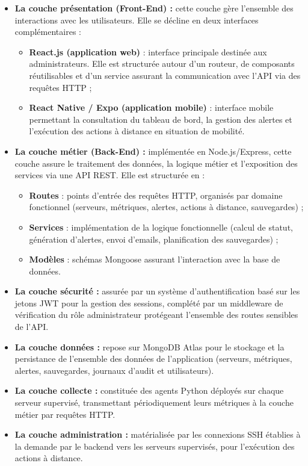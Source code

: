 \begin{itemize}[label=]
\item \textbf{La couche présentation (Front-End) :} cette couche gère l'ensemble des
interactions avec les utilisateurs. Elle se décline en deux interfaces complémentaires :
\begin{itemize}[label=]
    \item \textbf{React.js (application web)} : interface principale destinée aux
    administrateurs. Elle est structurée autour d'un routeur, de composants réutilisables
    et d'un service assurant la communication avec l'API via des requêtes HTTP ;
    \item \textbf{React Native / Expo (application mobile)} : interface mobile permettant
    la consultation du tableau de bord, la gestion des alertes et l'exécution des actions
    à distance en situation de mobilité.
\end{itemize}

\item \textbf{La couche métier (Back-End) :} implémentée en Node.js/Express, cette
couche assure le traitement des données, la logique métier et l'exposition des services
via une API REST. Elle est structurée en :
\begin{itemize}[label=]
    \item \textbf{Routes} : points d'entrée des requêtes HTTP, organisés par domaine
    fonctionnel (serveurs, métriques, alertes, actions à distance, sauvegardes) ;
    \item \textbf{Services} : implémentation de la logique fonctionnelle (calcul de
    statut, génération d'alertes, envoi d'emails, planification des sauvegardes) ;
    \item \textbf{Modèles} : schémas Mongoose assurant l'interaction avec la base de
    données.
\end{itemize}

\item \textbf{La couche sécurité :} assurée par un système d'authentification basé sur
les jetons JWT pour la gestion des sessions, complété par un middleware de vérification
du rôle administrateur protégeant l'ensemble des routes sensibles de l'API.

\item \textbf{La couche données :} repose sur MongoDB Atlas pour le stockage et la
persistance de l'ensemble des données de l'application (serveurs, métriques, alertes,
sauvegardes, journaux d'audit et utilisateurs).

\item \textbf{La couche collecte :} constituée des agents Python déployés sur chaque
serveur supervisé, transmettant périodiquement leurs métriques à la couche métier par
requêtes HTTP.

\item \textbf{La couche administration :} matérialisée par les connexions SSH établies à
la demande par le backend vers les serveurs supervisés, pour l'exécution des actions à
distance.
\end{itemize}

